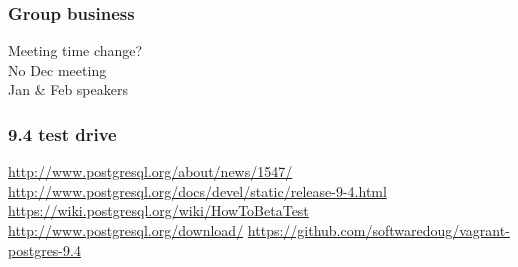 \documentclass{beamer}
\begin{document}
\frame
{
  \frametitle{Group business}
  \begin{center}
Meeting time change?\\
No Dec meeting\\
Jan \& Feb speakers\\
  \end{center}
}

\frame
{
  \frametitle{9.4 test drive}
  \url{http://www.postgresql.org/about/news/1547/}
  \url{http://www.postgresql.org/docs/devel/static/release-9-4.html}
  \url{https://wiki.postgresql.org/wiki/HowToBetaTest}
  \url{http://www.postgresql.org/download/}
  \url{https://github.com/softwaredoug/vagrant-postgres-9.4}
}
\end{document}

